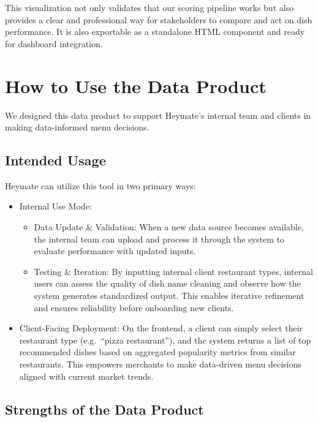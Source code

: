 \documentclass[
  11pt,
  a4paper,
  DIV=11,
  numbers=noendperiod]{scrartcl}
\providecommand{\tightlist}{%
  \setlength{\itemsep}{0pt}\setlength{\parskip}{0pt}}\usepackage{longtable,booktabs,array}
\begin{document}
This visualization not only validates that our scoring pipeline works
but also provides a clear and professional way for stakeholders to
compare and act on dish performance. It is also exportable as a
standalone HTML component and ready for dashboard integration.

\section{How to Use the Data Product}\label{how-to-use-the-data-product}

We designed this data product to support Heymate's internal team and
clients in making data-informed menu decisions.

\subsection{Intended Usage}\label{intended-usage}

Heymate can utilize this tool in two primary ways:

\begin{itemize}
\tightlist
\item
  Internal Use Mode:

  \begin{itemize}
  \tightlist
  \item
    Data Update \& Validation: When a new data source becomes available,
    the internal team can upload and process it through the system to
    evaluate performance with updated inputs.
  \item
    Testing \& Iteration: By inputting internal client restaurant types,
    internal users can assess the quality of dish name cleaning and
    observe how the system generates standardized output. This enables
    iterative refinement and ensures reliability before onboarding new
    clients.
  \end{itemize}
\item
  Client-Facing Deployment: On the frontend, a client can simply select
  their restaurant type (e.g.~``pizza restaurant''), and the system
  returns a list of top recommended dishes based on aggregated
  popularity metrics from similar restaurants. This empowers merchants
  to make data-driven menu decisions aligned with current market trends.
\end{itemize}

\subsection{Strengths of the Data
Product}\label{strengths-of-the-data-product}
\end{document}
